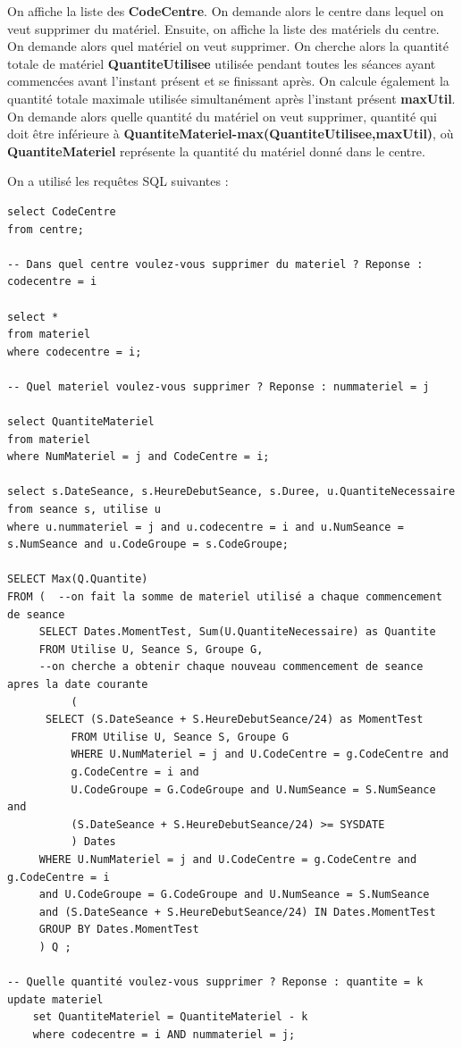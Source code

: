 \documentclass[10pt]{article}
\begin{document}
On affiche la liste des \textbf{CodeCentre}. On demande alors le centre dans lequel on veut supprimer du matériel. Ensuite, on affiche la liste des matériels du centre. On demande alors quel matériel on veut supprimer. On cherche
alors la quantité totale de matériel \textbf{QuantiteUtilisee} utilisée pendant toutes les séances ayant commencées avant l'instant présent et se finissant après. On calcule également la quantité totale maximale utilisée simultanément après l'instant présent \textbf{maxUtil}. On demande alors quelle quantité du matériel on veut supprimer, quantité qui doit être inférieure à \textbf{QuantiteMateriel-max(QuantiteUtilisee,maxUtil)}, où \textbf{QuantiteMateriel} représente la quantité du matériel donné dans le centre.

On a utilisé les requêtes SQL suivantes :

\begin{small}
\begin{verbatim}
select CodeCentre
from centre;

-- Dans quel centre voulez-vous supprimer du materiel ? Reponse : codecentre = i

select *
from materiel 
where codecentre = i;

-- Quel materiel voulez-vous supprimer ? Reponse : nummateriel = j

select QuantiteMateriel
from materiel
where NumMateriel = j and CodeCentre = i;

select s.DateSeance, s.HeureDebutSeance, s.Duree, u.QuantiteNecessaire
from seance s, utilise u
where u.nummateriel = j and u.codecentre = i and u.NumSeance = s.NumSeance and u.CodeGroupe = s.CodeGroupe;

SELECT Max(Q.Quantite)
FROM ( 	--on fait la somme de materiel utilisé a chaque commencement de seance
     SELECT Dates.MomentTest, Sum(U.QuantiteNecessaire) as Quantite
     FROM Utilise U, Seance S, Groupe G, 
     --on cherche a obtenir chaque nouveau commencement de seance apres la date courante
          (
	  SELECT (S.DateSeance + S.HeureDebutSeance/24) as MomentTest
     	  FROM Utilise U, Seance S, Groupe G
     	  WHERE U.NumMateriel = j and U.CodeCentre = g.CodeCentre and 
     	  g.CodeCentre = i and
     	  U.CodeGroupe = G.CodeGroupe and U.NumSeance = S.NumSeance and 
     	  (S.DateSeance + S.HeureDebutSeance/24) >= SYSDATE
     	  ) Dates
     WHERE U.NumMateriel = j and U.CodeCentre = g.CodeCentre and g.CodeCentre = i
     and U.CodeGroupe = G.CodeGroupe and U.NumSeance = S.NumSeance 
     and (S.DateSeance + S.HeureDebutSeance/24) IN Dates.MomentTest
     GROUP BY Dates.MomentTest
     ) Q ;

-- Quelle quantité voulez-vous supprimer ? Reponse : quantite = k
update materiel
	set QuantiteMateriel = QuantiteMateriel - k
	where codecentre = i AND nummateriel = j;
\end{verbatim}
\end{small}
\end{document}
